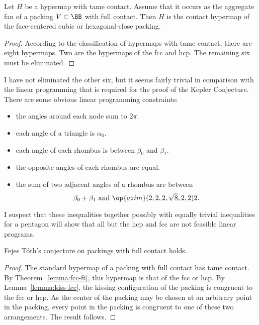 \begin{lemma}[]\label{lemma:fcc-ft} Let $H$ be a hypermap
  with tame contact.  Assume that it occurs as the aggregate fan of a
   packing $V\subset\BB$  with full contact.  Then $H$ is the contact
  hypermap of the face-centered cubic or hexagonal-close packing.
\end{lemma}

\begin{proof} According to the classification of hypermaps with tame
  contact, there are eight hypermaps.  Two are the hypermaps of the
  fcc and hcp.  The remaining six must be eliminated.
\end{proof}

\begin{note}%
  I have not eliminated the other six, but it seems fairly trivial in
  comparison with the linear programming that is required for the
  proof of the Kepler Conjecture.  There are some obvious linear
  programming constraints:
\begin{itemize}
\item the angles around each node sum to $2\pi$.
\item each angle of a triangle is $\alpha_0$.
\item each angle of each rhombus is between $\beta_0$ and $\beta_1$.
\item the opposite angles of each rhombus are equal.
\item the sum of two adjacent angles of a rhombus are between
\begin{displaymath}
\beta_0 + \beta_1 \hbox{ and } \op{azim}(2,2,2,\sqrt8,2,2)2.
\end{displaymath}
\end{itemize}
I suspect that these inequalities together possibly with equally
trivial inequalities for a pentagon will show that all but the hcp and
fcc are not feasible linear programs.
\end{note}

\begin{theorem}  
Fejes T\'oth's conjecture on packings with full contact holds.
\end{theorem}
%

\begin{proof} The standard hypermap of a  packing with full
  contact has tame contact.  By Theorem~\ref{lemma:fcc-ft}, this
  hypermap is that of the fcc or hcp.  By Lemma~\ref{lemma:kiss-fcc},
  the kissing configuration of the  packing is congruent to
  the fcc or hcp.  As the center of the packing may be chosen at an
  arbitrary point in the packing, every point in the packing is
  congruent to one of these two arrangements.  The result follows.
\end{proof}
%
%

